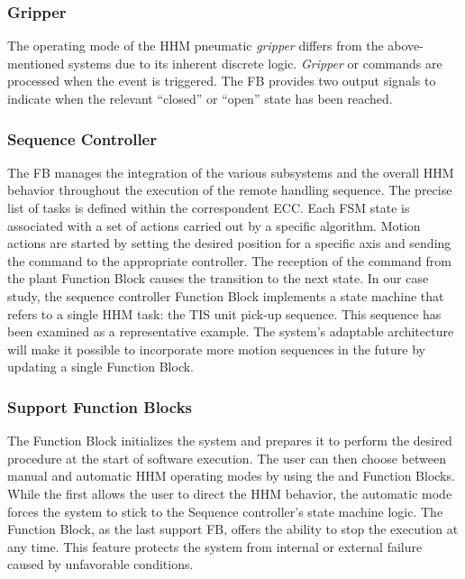\documentclass{ieeeojies}
\newcommand{\quotes}[1]{``#1''}
\begin{document}
\subsubsection{Gripper}
The operating mode of the HHM pneumatic \textit{gripper} differs from the above-mentioned systems due to its inherent discrete logic. 
\textit{Gripper}  or  commands are processed when the  event is triggered. The FB provides two output signals to indicate when the relevant \quotes{closed} or \quotes{open} state has been reached. 

\subsubsection{Sequence Controller}
The  FB manages the integration of the various subsystems and the overall HHM behavior throughout the execution of the remote handling sequence. The precise list of tasks is defined within the correspondent ECC. 
Each FSM state is associated with a set of actions carried out by a specific algorithm. Motion actions are started by setting the desired position for a specific axis and sending the  command to the appropriate controller. The reception of the  command from the plant Function Block causes the transition to the next state. In our case study, the sequence controller Function Block implements a state machine that refers to a single HHM task: the TIS unit pick-up sequence. This sequence has been examined as a representative example. The system's adaptable architecture will make it possible to incorporate more motion sequences in the future by updating a single Function Block.

\subsubsection{Support Function Blocks}
The  Function Block initializes the system and prepares it to perform the desired procedure at the start of software execution.
The user can then choose between manual and automatic HHM operating modes by using the  and  Function Blocks.
While the first allows the user to direct the HHM behavior, the automatic mode forces the system to stick to the Sequence controller's state machine logic.
The  Function Block, as the last support FB, offers the ability to stop the execution at any time. This feature protects the system from internal or external failure caused by unfavorable conditions.
\end{document}
